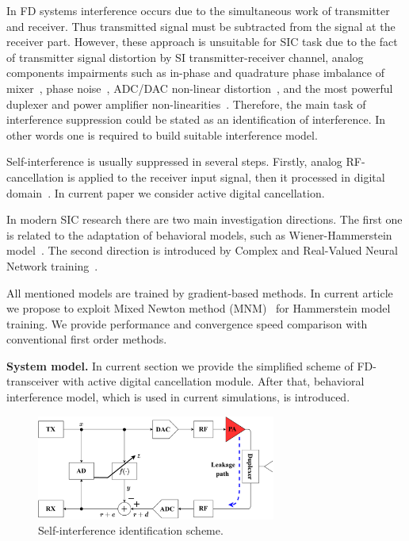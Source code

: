 \documentclass[12pt]{article}
\begin{document}
In FD systems interference occurs due to the simultaneous work of transmitter and receiver. Thus transmitted signal must be subtracted from the signal at the receiver part. However, these approach is unsuitable for SIC task due to the fact of transmitter signal distortion by SI transmitter-receiver channel, analog components impairments such as in-phase and quadrature phase imbalance of mixer~\cite{linear_sic}, phase noise~\cite{phase_noise}, ADC/DAC non-linear distortion~\cite{impairments}, and the most powerful duplexer and power amplifier non-linearities~\cite{behav_model_ghann}. Therefore, the main task of interference suppression could be stated as an identification of interference. In other words one is required to build suitable interference model.

Self-interference is usually suppressed in several steps. Firstly, analog RF-cancellation is applied to the receiver input signal, then it processed in digital domain~\cite{behav_model}. In current paper we consider active digital cancellation.

In modern SIC research there are two main investigation directions. The first one is related to the adaptation of behavioral models, such as Wiener-Hammerstein model~\cite{wiener_hammerst, spline_sic}. The second direction is introduced by Complex and Real-Valued Neural Network training~\cite{ffnn, advanced_ml, hlnn}. 

All mentioned models are trained by gradient-based methods. In current article we propose to exploit Mixed Newton method (MNM)~\cite{mixed_newton} for Hammerstein model training. We provide performance and convergence speed comparison with conventional first order methods.

\textbf{System model.}
In current section we provide the simplified scheme of FD-transceiver with active digital cancellation module. After that, behavioral interference model, which is used in current simulations, is introduced.

\begin{figure}[h!]
\centerline{\includegraphics[width = 0.7\textwidth]{figures/ident_problem/ident_problem.pdf}}
\caption{Self-interference identification scheme.}
\label{ident_problem}
\end{figure}
\end{document}
